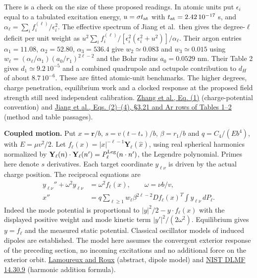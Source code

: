 \documentclass[11pt,a4paper]{article}
\begin{document}
There is a check on the size of these proposed readings. In atomic units
put \(\epsilon_i\) equal to a tabulated excitation energy,
\(u=\sigma t_{\rm at}\) with \(t_{\rm at}=2.42\,10^{-17}\) s, and
\(\alpha_\ell=\sum_i f_i^{(\ell)}/\epsilon_i^2\). The effective spectrum
of Jiang et al.~then gives the degree-\(\ell\) deficit per unit weight
as
\(u^2\sum_i f_i^{(\ell)}/[\epsilon_i^2(\epsilon_i^2+u^2)]/\alpha_\ell\).
Their argon entries \(\alpha_1=11.08\), \(\alpha_2=52.80\),
\(\alpha_3=536.4\) give \(w_2\simeq0.083\) and \(w_3\simeq0.015\) using
\(w_\ell=(\alpha_\ell/\alpha_1)(a_0/r_1)^{2\ell-2}\) and the Bohr radius
\(a_0=0.0529\) nm. Their Table 2 gives \(d_1\simeq9.2\,10^{-5}\) and a
combined quadrupole and octupole contribution to \(d_H\) of about
\(8.7\,10^{-6}\). These are fitted atomic-unit benchmarks. The higher
degrees, charge penetration, equilibrium work and a clocked response at
the proposed field strength still need independent calibration.
\href{https://arxiv.org/pdf/1108.0150}{Zhang et al., Eq. (1)}
(charge-potential convention) and
\href{https://arxiv.org/pdf/1410.7957}{Jiang et al., Eqs. (2)--(4),
§3.21 and Ar rows of Tables 1--2} (method and table passages).

\textbf{Coupled motion.} Put \(x=\mathbf r/b\), \(s=v(t-t_*)/b\),
\(\beta=r_1/b\) and \(q=C_4/(Eb^4)\), with \(E=\mu v^2/2\). Let
\(f_\ell(x)=|x|^{-\ell-1}\mathbf Y_\ell(\hat x)\), using real spherical
harmonics normalized by \(\mathbf Y_\ell(n)\cdot\mathbf Y_\ell(n')=
P_\ell^{\rm Leg}(n\cdot n')\), the Legendre polynomial. Primes here
denote \(s\) derivatives. Each target coordinate \(y_{\ell\nu}\) is
driven by the actual charge position. The reciprocal equations are \[
 \begin{aligned}
 y_{\ell\nu}''+\omega^2y_{\ell\nu}&=\omega^2 f_\ell(x),\qquad
        \omega=\nu b/v,\\
 x''&=q\sum_{\ell\ge1}w_\ell\beta^{2\ell-2}
        Df_\ell(x)^T\int y_{\ell\nu}\,dP_\ell .
 \end{aligned}
\] Indeed the mode potential is proportional to
\(|y|^2/2-y\cdot f_\ell(x)\) with the displayed positive weight and mode
kinetic term \(|y'|^2/(2\omega^2)\). Equilibrium gives \(y=f_\ell\) and
the measured static potential. Classical oscillator models of induced
dipoles are established. The model here assumes the convergent exterior
response of the preceding section, no incoming excitations and no
additional force on the exterior orbit.
\href{https://doi.org/10.1063/1.1589749}{Lamoureux and Roux} (abstract,
dipole model) and \href{https://dlmf.nist.gov/14.30.E9}{NIST DLMF
14.30.9} (harmonic addition formula).
\end{document}
